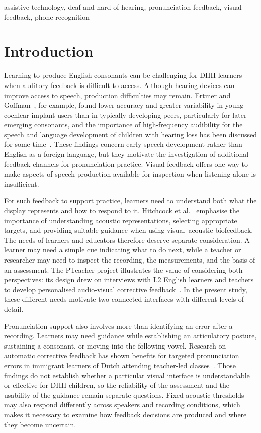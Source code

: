\documentclass[conference]{IEEEtran}
\begin{document}
\begin{IEEEkeywords}
assistive technology, deaf and hard-of-hearing, pronunciation feedback, visual feedback, phone recognition
\end{IEEEkeywords}

\section{Introduction}
Learning to produce English consonants can be challenging for DHH learners when auditory feedback is difficult to access. Although hearing devices can improve access to speech, production difficulties may remain. Ertmer and Goffman~\cite{ertmer2011}, for example, found lower accuracy and greater variability in young cochlear implant users than in typically developing peers, particularly for later-emerging consonants, and the importance of high-frequency audibility for the speech and language development of children with hearing loss has been discussed for some time~\cite{stelmachowicz2004}. These findings concern early speech development rather than English as a foreign language, but they motivate the investigation of additional feedback channels for pronunciation practice. Visual feedback offers one way to make aspects of speech production available for inspection when listening alone is insufficient.

For such feedback to support practice, learners need to understand both what the display represents and how to respond to it. Hitchcock et al.~\cite{hitchcock2023} emphasise the importance of understanding acoustic representations, selecting appropriate targets, and providing suitable guidance when using visual--acoustic biofeedback. The needs of learners and educators therefore deserve separate consideration. A learner may need a simple cue indicating what to do next, while a teacher or researcher may need to inspect the recording, the measurements, and the basis of an assessment. The PTeacher project illustrates the value of considering both perspectives: its design drew on interviews with L2 English learners and teachers to develop personalised audio-visual corrective feedback~\cite{bu2021}. In the present study, these different needs motivate two connected interfaces with different levels of detail.

Pronunciation support also involves more than identifying an error after a recording. Learners may need guidance while establishing an articulatory posture, sustaining a consonant, or moving into the following vowel. Research on automatic corrective feedback has shown benefits for targeted pronunciation errors in immigrant learners of Dutch attending teacher-led classes~\cite{neri2006}. Those findings do not establish whether a particular visual interface is understandable or effective for DHH children, so the reliability of the assessment and the usability of the guidance remain separate questions. Fixed acoustic thresholds may also respond differently across speakers and recording conditions, which makes it necessary to examine how feedback decisions are produced and where they become uncertain.
\end{document}
